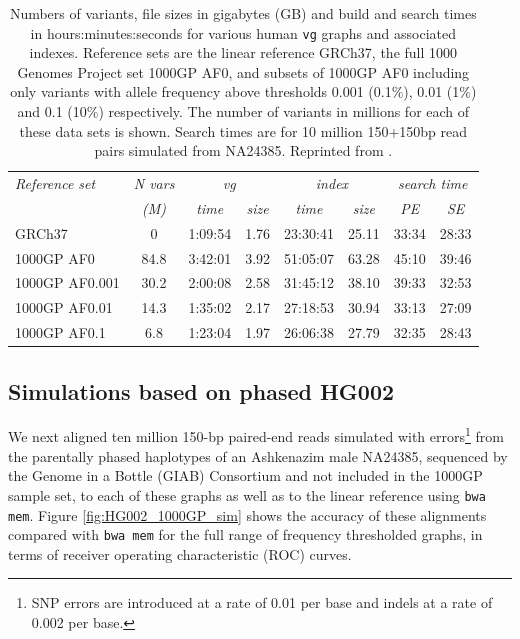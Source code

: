 \documentclass[a4paper,12pt,numbered,oneside]{Classes/PhDThesisPSnPDF}
\begin{document}
\begin{table}[h]
\begin{tabular}{l||c|cc|cc|cc}
\itshape Reference set & \itshape N vars & \multicolumn{2}{c}{\itshape vg} & \multicolumn{2}{c}{\itshape index} & \multicolumn{2}{c}{\itshape search time}\\
& \itshape (M) & \itshape time & \itshape size & \itshape time & \itshape size & \itshape  PE & \itshape SE\\
\hline
GRCh37 & 0 & 1:09:54 & 1.76 & 23:30:41 & 25.11 & 33:34 & 28:33 \\
1000GP AF0 & 84.8 & 3:42:01 & 3.92 & 51:05:07 & 63.28 & 45:10 & 39:46 \\
1000GP AF0.001 & 30.2 & 2:00:08 & 2.58 & 31:45:12 & 38.10 & 39:33 & 32:53 \\
1000GP AF0.01 & 14.3 & 1:35:02 & 2.17 & 27:18:53 & 30.94 & 33:13 & 27:09\\
1000GP AF0.1 & 6.8 & 1:23:04 & 1.97 & 26:06:38 & 27.79 & 32:35 & 28:43 \\
\hline
\end{tabular}
\caption[1000GP variation graphs]{Numbers of variants, file sizes in gigabytes (GB) and build and search times in hours:minutes:seconds for various human {\tt vg} graphs and associated indexes. Reference sets are the linear reference GRCh37, the full 1000 Genomes Project set 1000GP AF0, and subsets of 1000GP AF0 including only variants with allele frequency above thresholds 0.001 (0.1\%), 0.01 (1\%) and 0.1 (10\%) respectively.  The number of variants in millions for each of these data sets is shown.  Search times are for 10 million 150+150bp read pairs simulated from NA24385.
    Reprinted from \cite{garrison2018variation}.
}
\label{table:1000GP}
\end{table}

\subsection{Simulations based on phased HG002}
\label{sec:1000GP_sim}

We next aligned ten million 150-bp paired-end reads simulated with errors\footnote{SNP errors are introduced at a rate of 0.01 per base and indels at a rate of 0.002 per base.} from the parentally phased haplotypes of an Ashkenazim male NA24385, sequenced by the Genome in a Bottle (GIAB) Consortium \cite{zook2016extensive} and not included in the 1000GP sample set, to each of these graphs as well as to the linear reference using {\tt bwa mem}.
Figure \ref{fig:HG002_1000GP_sim} shows the accuracy of these alignments compared with {\tt bwa mem} for the full range of frequency thresholded graphs, in terms of receiver operating characteristic (ROC) curves.
\end{document}

